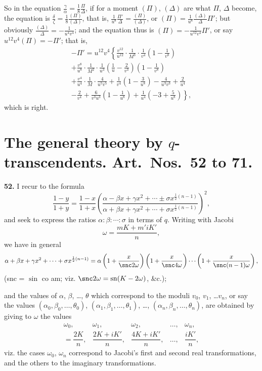 \documentclass[11pt,a4paper]{book}
\providecommand{\sn}{\mathrm{sn}}
\begin{document}
So in the equation $\frac{\gamma}{\alpha} = \frac{1}{8}\frac{\Pi}{\Delta}$, if for a moment $(\Pi)$, $(\Delta)$ are what $\Pi$, $\Delta$ become, the equation is $\frac{\delta}{\zeta} = \frac{1}{8}\frac{(\Pi)}{(\Delta)}$, that is, $\frac{1}{u^8}\frac{\Pi'}{\Delta} = \frac{(\Pi)}{(\Delta)}$, or $(\Pi) = \frac{1}{u^8}\frac{(\Delta)}{\Delta}\Pi'$; but obviously $\frac{(\Delta)}{\Delta} = -\frac{1}{u^4 v^4}$; and the equation thus is $(\Pi) = -\frac{1}{u^{12}v^4}\Pi'$, or say $u^{12}v^4(\Pi) = -\Pi'$; that is,
\begin{multline*}
-\Pi' = u^{12}v^4\left\{
\frac{v^{12}}{u^{12}} \cdot \frac{1}{M^3} \cdot \frac{1}{v^4}\left(1 - \frac{1}{v^8}\right)\right. \\
+ \frac{v^8}{u^8} \cdot \frac{1}{M^2} \cdot \frac{1}{u^3}\left(\frac{1}{u} - \frac{2}{v^3}\right)\left(1 - \frac{1}{v^8}\right) \\
+ \frac{v^4}{u^4} \cdot \frac{1}{M} \cdot \frac{4}{u^5 v^5} + \frac{1}{v^4}\left(1 - \frac{3}{u^8}\right) - \frac{4}{u^3 v^3} + \frac{2}{u^4} \\
\left. - \frac{2}{v^4} + \frac{6}{v^3 u^3}\left(1 - \frac{1}{u^8}\right) + \frac{1}{u^4}\left(-3 + \frac{5}{u^8}\right)\right\},
\end{multline*}
which is right.




\section*{The general theory by $q$-transcendents. Art.~Nos.~52 to 71.}

\textbf{52.} I recur to the formula
\[
\frac{1 - y}{1 + y} = \frac{1 - x}{1 + x}
\left(\frac{\alpha - \beta x + \gamma x^2 + \cdots \pm \sigma x^{\frac{1}{2}(n-1)}}
{\alpha + \beta x + \gamma x^2 + \cdots + \sigma x^{\frac{1}{2}(n-1)}}\right)^2,
\]
and seek to express the ratios $\alpha : \beta : \cdots : \sigma$ in terms of $q$. Writing with Jacobi
\[
\omega = \frac{mK + m'iK'}{n},
\]
we have in general
\[
\alpha + \beta x + \gamma x^2 + \cdots + \sigma x^{\frac{1}{2}(n-1)}
= \alpha\left(1 + \frac{x}{\snc 2\omega}\right)
\left(1 + \frac{x}{\snc 4\omega}\right) \cdots
\left(1 + \frac{x}{\snc (n-1)\omega}\right),
\]
(snc = $\sin$ co am; viz. $\snc 2\omega = \sn(K - 2\omega)$, \&c.);

and the values of $\alpha$, $\beta$, \ldots, $\theta$ which correspond to the moduli $v_0$, $v_1$, \ldots $v_n$, or say the values $(\alpha_0, \beta_0, \ldots, \theta_0)$, $(\alpha_1, \beta_1, \ldots, \theta_1)$, \ldots, $(\alpha_n, \beta_n, \ldots, \theta_n)$, are obtained by giving to $\omega$ the values
\[
\begin{array}{ccccc}
\omega_0, & \omega_1, & \omega_2, & \ldots, & \omega_n, \\
= \dfrac{2K}{n}, & \dfrac{2K + iK'}{n}, & \dfrac{4K + iK'}{n}, & \ldots, & \dfrac{iK'}{n},
\end{array}
\]
viz. the cases $\omega_0$, $\omega_n$ correspond to Jacobi's first and second real transformations, and the others to the imaginary transformations.
\end{document}
